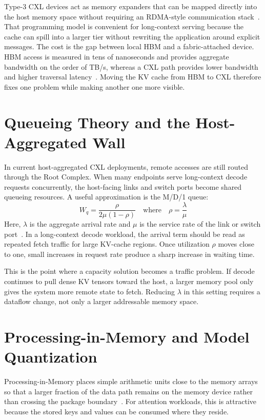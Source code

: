 Type-3 CXL devices act as memory expanders that can be mapped directly into the host memory space without requiring an RDMA-style communication stack~\cite{direct_cxl}. That programming model is convenient for long-context serving because the cache can spill into a larger tier without rewriting the application around explicit messages. The cost is the gap between local HBM and a fabric-attached device. HBM access is measured in tens of nanoseconds and provides aggregate bandwidth on the order of TB/s, whereas a CXL path provides lower bandwidth and higher traversal latency~\cite{tpp}. Moving the KV cache from HBM to CXL therefore fixes one problem while making another one more visible.

\section{Queueing Theory and the Host-Aggregated Wall}

In current host-aggregated CXL deployments, remote accesses are still routed through the Root Complex. When many endpoints serve long-context decode requests concurrently, the host-facing links and switch ports become shared queueing resources. A useful approximation is the M/D/1 queue:
\begin{equation}
\label{eq:queue}
W_q = \frac{\rho}{2\mu(1 - \rho)} \quad \text{where} \quad \rho = \frac{\lambda}{\mu}
\end{equation}
Here, $\lambda$ is the aggregate arrival rate and $\mu$ is the service rate of the link or switch port~\cite{kleinrock}. In a long-context decode workload, the arrival term should be read as repeated fetch traffic for large KV-cache regions. Once utilization $\rho$ moves close to one, small increases in request rate produce a sharp increase in waiting time.

This is the point where a capacity solution becomes a traffic problem. If decode continues to pull dense KV tensors toward the host, a larger memory pool only gives the system more remote state to fetch. Reducing $\lambda$ in this setting requires a dataflow change, not only a larger addressable memory space.

\section{Processing-in-Memory and Model Quantization}

Processing-in-Memory places simple arithmetic units close to the memory arrays so that a larger fraction of the data path remains on the memory device rather than crossing the package boundary~\cite{pim_survey}. For attention workloads, this is attractive because the stored keys and values can be consumed where they reside.

